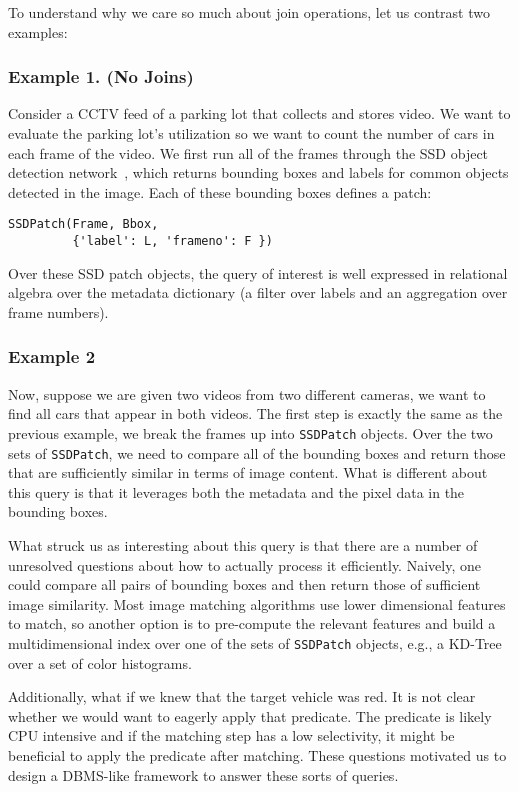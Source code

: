 To understand why we care so much about join operations, let us contrast two examples:

\subsubsection{Example 1. (No Joins)}
Consider a CCTV feed of a parking lot that collects and stores video.
We want to evaluate the parking lot's utilization so we want to count the number of cars in each frame of the video.
We first run all of the frames through the SSD object detection network~\cite{liu2016ssd}, which returns bounding boxes and labels for common objects detected in the image.
Each of these bounding boxes defines a patch:
\begin{lstlisting}
SSDPatch(Frame, Bbox, 
         {'label': L, 'frameno': F })
\end{lstlisting}
Over these SSD patch objects, the query of interest is well expressed in relational algebra over the metadata dictionary (a filter over labels and an aggregation over frame numbers).

\subsubsection{Example 2}
Now, suppose we are given two videos from two different cameras, we want to find all cars that appear in both videos.
The first step is exactly the same as the previous example, we break the frames up into \texttt{SSDPatch} objects.
Over the two sets of \texttt{SSDPatch}, we need to compare all of the bounding boxes and return those that are sufficiently similar in terms of image content.
What is different about this query is that it leverages both the metadata and the pixel data in the bounding boxes.

What struck us as interesting about this query is that there are a number of unresolved questions about how to actually process it efficiently.
Naively, one could compare all pairs of bounding boxes and then return those of sufficient image similarity.
Most image matching algorithms use lower dimensional features to match, so another option is to pre-compute the relevant features and build a multidimensional index over one of the sets of \texttt{SSDPatch} objects, e.g., a KD-Tree over a set of color histograms.

Additionally, what if we knew that the target vehicle was red.
It is not clear whether we would want to eagerly apply that predicate. 
The predicate is likely CPU intensive and if the matching step has a low selectivity, it might be beneficial to apply the predicate after matching.
These questions motivated us to design a DBMS-like framework to answer these sorts of queries.


